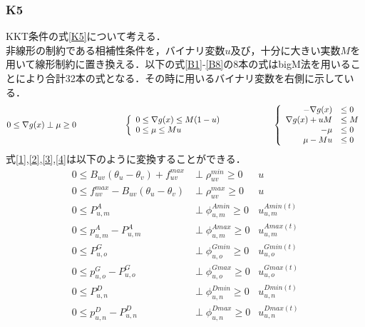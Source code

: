 \documentclass[a4j,10.5pt,fleqn]{jarticle}
\begin{document}
\subsubsection{K5}
KKT条件の式\ref{K5}について考える．\\
非線形の制約である相補性条件を，バイナリ変数$u$及び，十分に大きい実数$M$を用いて線形制約に置き換える．以下の式\ref{B1}-\ref{B8}の8本の式はbigM法を用いることにより合計32本の式となる．その時に用いるバイナリ変数を右側に示している．
\begin{align}
0\leq \nabla g(x) \perp \mu \geq 0\hspace{20mm}
\left\{
\begin{array}{l}
0\leq \nabla g(x) \leq M(1-u)\\
0\leq \mu \leq Mu 
\end{array}
\right.\hspace{20mm}
\left\{
\begin{array}{rl}
- \nabla g(x)&\leq 0\\
 \nabla g(x)+uM &\leq M\\
-\mu &\leq 0\\
\mu -Mu &\leq 0
\end{array}
\right.
\end{align}
式\ref{1},\ref{2},\ref{3},\ref{4}は以下のように変換することができる．
\begin{align}
0\le B_{uv}(\theta_u-\theta_v)+f_{uv}^{max}&\perp \rho_{uv}^{min}\ge 0&u_{}^{}\label{B1}\tag{B1}\\
0\le f_{uv}^{max}-B_{uv}(\theta_u-\theta_v)&\perp \rho_{uv}^{max}\ge 0&u_{}^{}\label{B2}\tag{B2}\\
0\le P_{u,m}^A&\perp \phi_{u,m}^{Amin}\ge 0&u_{u,m}^{Amin(t)}\label{B3}\tag{B3}\\
0\le p_{u,m}^A-P_{u,m}^A&\perp \phi_{u,m}^{Amax}\ge0&u_{u,m}^{Amax(t)}\label{B4}\tag{B4}\\
0\le P_{u,o}^G&\perp \phi_{u,o}^{Gmin}\ge 0&u_{u,o}^{Gmin(t)}\label{B5}\tag{B5}\\
0\le p_{u,o}^G-P_{u,o}^G&\perp \phi_{u,o}^{Gmax} \ge0&u_{u,o}^{Gmax(t)}\label{B6}\tag{B6}\\
0\le P_{u,n}^D&\perp \phi_{u,n}^{Dmin}\ge 0&u_{u,n}^{Dmin(t)}\label{B7}\tag{B7}\\
0\le p_{u,n}^D-P_{u,n}^D&\perp \phi_{u,n}^{Dmax}\ge0&u_{u,n}^{Dmax(t)}\label{B8}\tag{B8}
\end{align}
\newpage
\end{document}
